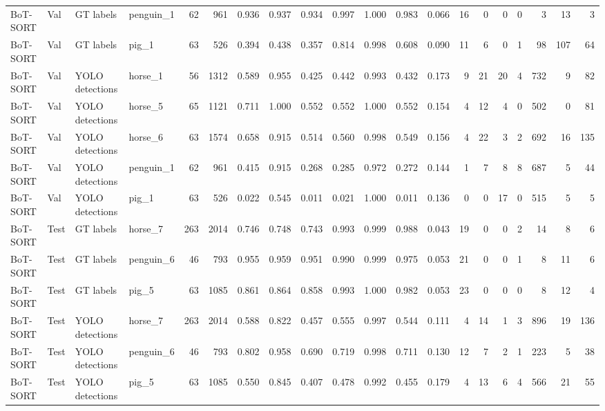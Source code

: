 \begin{table}
\begin{tabular}{llllrrrrrrrrrrrrrrrr}
BoT-SORT & Val & GT labels & penguin_1 & 62 & 961 & 0.936 & 0.937 & 0.934 & 0.997 & 1.000 & 0.983 & 0.066 & 16 & 0 & 0 & 0 & 3 & 13 & 3 \\
BoT-SORT & Val & GT labels & pig_1 & 63 & 526 & 0.394 & 0.438 & 0.357 & 0.814 & 0.998 & 0.608 & 0.090 & 11 & 6 & 0 & 1 & 98 & 107 & 64 \\
BoT-SORT & Val & YOLO detections & horse_1 & 56 & 1312 & 0.589 & 0.955 & 0.425 & 0.442 & 0.993 & 0.432 & 0.173 & 9 & 21 & 20 & 4 & 732 & 9 & 82 \\
BoT-SORT & Val & YOLO detections & horse_5 & 65 & 1121 & 0.711 & 1.000 & 0.552 & 0.552 & 1.000 & 0.552 & 0.154 & 4 & 12 & 4 & 0 & 502 & 0 & 81 \\
BoT-SORT & Val & YOLO detections & horse_6 & 63 & 1574 & 0.658 & 0.915 & 0.514 & 0.560 & 0.998 & 0.549 & 0.156 & 4 & 22 & 3 & 2 & 692 & 16 & 135 \\
BoT-SORT & Val & YOLO detections & penguin_1 & 62 & 961 & 0.415 & 0.915 & 0.268 & 0.285 & 0.972 & 0.272 & 0.144 & 1 & 7 & 8 & 8 & 687 & 5 & 44 \\
BoT-SORT & Val & YOLO detections & pig_1 & 63 & 526 & 0.022 & 0.545 & 0.011 & 0.021 & 1.000 & 0.011 & 0.136 & 0 & 0 & 17 & 0 & 515 & 5 & 5 \\
BoT-SORT & Test & GT labels & horse_7 & 263 & 2014 & 0.746 & 0.748 & 0.743 & 0.993 & 0.999 & 0.988 & 0.043 & 19 & 0 & 0 & 2 & 14 & 8 & 6 \\
BoT-SORT & Test & GT labels & penguin_6 & 46 & 793 & 0.955 & 0.959 & 0.951 & 0.990 & 0.999 & 0.975 & 0.053 & 21 & 0 & 0 & 1 & 8 & 11 & 6 \\
BoT-SORT & Test & GT labels & pig_5 & 63 & 1085 & 0.861 & 0.864 & 0.858 & 0.993 & 1.000 & 0.982 & 0.053 & 23 & 0 & 0 & 0 & 8 & 12 & 4 \\
BoT-SORT & Test & YOLO detections & horse_7 & 263 & 2014 & 0.588 & 0.822 & 0.457 & 0.555 & 0.997 & 0.544 & 0.111 & 4 & 14 & 1 & 3 & 896 & 19 & 136 \\
BoT-SORT & Test & YOLO detections & penguin_6 & 46 & 793 & 0.802 & 0.958 & 0.690 & 0.719 & 0.998 & 0.711 & 0.130 & 12 & 7 & 2 & 1 & 223 & 5 & 38 \\
BoT-SORT & Test & YOLO detections & pig_5 & 63 & 1085 & 0.550 & 0.845 & 0.407 & 0.478 & 0.992 & 0.455 & 0.179 & 4 & 13 & 6 & 4 & 566 & 21 & 55 \\
\bottomrule
\end{tabular}
\end{table}
